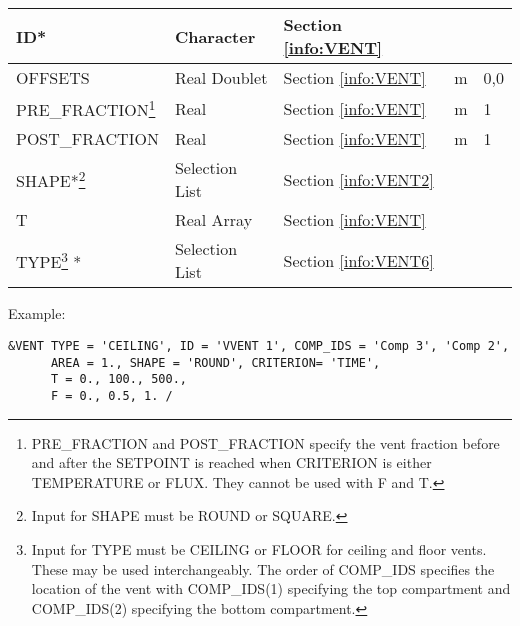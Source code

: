 \begin{minipage}{6.5in}
\begin{longtable}{@{\extracolsep{\fill}}|l|l|l|l|l|}
{\ct ID}*                                                         & Character  	          & Section \ref{info:VENT}      &                             &                 \\ \hline
{\ct OFFSETS}       					 & Real Doublet 		  & Section \ref{info:VENT}      & m                           &      0,0        \\ \hline
{\ct PRE\_FRACTION}\footnote{{\ct PRE\_FRACTION} and {\ct POST\_FRACTION} specify the vent fraction before and after the {\ct SETPOINT} is reached when {\ct CRITERION} is either {\ct TEMPERATURE} or {\ct FLUX}. They cannot be used with {\ct F} and {\ct T}.}       					 & Real 		  & Section \ref{info:VENT}      & m                           &      1        \\ \hline
{\ct POST\_FRACTION}       					 & Real 		  & Section \ref{info:VENT}      & m                           &      1        \\ \hline
{\ct SHAPE}*\footnote{Input for {\ct SHAPE} must be {\ct ROUND} or {\ct SQUARE}.}
                                                                 & Selection List         & Section \ref{info:VENT2}     &                             &                 \\ \hline
{\ct T}  					 & Real Array  		  & Section \ref{info:VENT}      &                             &                 \\ \hline
{\ct TYPE}\footnote{Input for {\ct TYPE} must be {\ct CEILING} or {\ct FLOOR} for ceiling and floor vents. These may be used interchangeably. The order of {\ct COMP\_IDS} specifies the location of the vent with {\ct COMP\_IDS(1)} specifying the top compartment and {\ct COMP\_IDS(2)} specifying the bottom compartment.} *
                                                                 & Selection List         & Section \ref{info:VENT6}     &                             &                 \\ \hline
\end{longtable}
\end{minipage}


\noindent Example:
\begin{lstlisting}
&VENT TYPE = 'CEILING', ID = 'VVENT 1', COMP_IDS = 'Comp 3', 'Comp 2',
      AREA = 1., SHAPE = 'ROUND', CRITERION= 'TIME',
      T = 0., 100., 500.,
      F = 0., 0.5, 1. /

\end{lstlisting}


